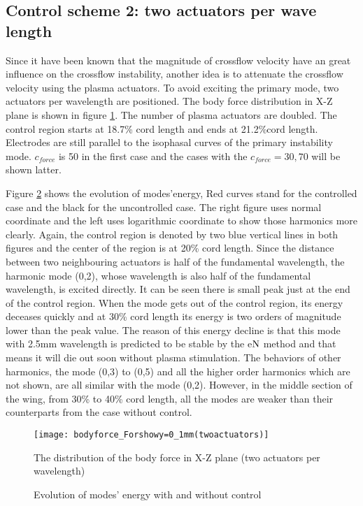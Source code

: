 \documentclass{AIAA}
\begin{document}
\subsection{Control scheme 2: two actuators per wave length}\label{subs:control2}
Since it have been known that the magnitude of crossflow velocity have an great influence on the crossflow instability, another idea is to attenuate the crossflow velocity using the plasma actuators. To avoid exciting the primary mode, two actuators per wavelength are positioned. The body force distribution in X-Z plane is shown in figure \ref{f:force2perwavelength}. The number of plasma actuators are doubled. The control region starts at 18.7\% cord length and ends at 21.2\%cord length. Electrodes are still parallel to the isophasal curves of the primary instability mode. $c_{force}$ is 50 in the first case and the cases with the $c_{force}=30,70$ will be shown latter.

Figure \ref{f:basecase} shows the evolution of modes'energy, Red curves stand for the controlled case and the black for the uncontrolled case. The right figure uses normal coordinate and the left uses logarithmic coordinate to show those harmonics more clearly. Again, the control region is denoted by two blue vertical lines in both figures and the center of the region is at 20\% cord length. Since the distance between two neighbouring actuators is half of the fundamental wavelength, the harmonic mode (0,2), whose wavelength is also half of the fundamental wavelength, is excited directly. It can be seen there is small peak just at the end of the control region. When the mode gets out of the control region, its energy deceases quickly and at 30\% cord length its energy is two orders of magnitude lower than the peak value. The reason of this energy decline is that this mode with 2.5mm wavelength is predicted to be stable by the e${\rm N}$ method and that means it will die out soon without plasma stimulation. The behaviors of other harmonics, the mode (0,3) to (0,5) and all the higher order harmonics which are not shown, are all similar with the mode (0,2). However, in the middle section of the wing, from 30\% to 40\% cord length, all the modes are weaker than their counterparts from the case without control. 
\begin{figure}
\centering
  \texttt{[image: bodyforce\_Forshowy=0\_1mm(twoactuators)]}
  \caption{The distribution of the body force in X-Z plane (two actuators per wavelength)}%
  \label{f:force2perwavelength}
\end{figure}
\begin{figure}
\centering
  \caption{Evolution of modes' energy with and without control}%
  \label{f:basecase}
\end{figure}
\end{document}
